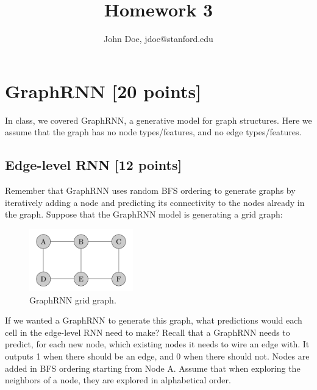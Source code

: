 \documentclass{article}
\title{Homework 3}
\author{John Doe, jdoe@stanford.edu}
\begin{document}
\maketitle

\section{GraphRNN [20 points]}

In class, we covered GraphRNN, a generative model for graph structures. Here we assume that the graph has no node types/features, and no edge types/features.

\subsection{Edge-level RNN [12 points]}
Remember that GraphRNN uses random BFS ordering to generate graphs by
iteratively adding a node and predicting its connectivity to the nodes already in the graph. Suppose that the GraphRNN model is generating a grid graph:
\begin{figure}[H]
    \centering
    \includegraphics[width=0.4\textwidth]{hw3-q1.jpg}
    \caption{GraphRNN grid graph.}
\end{figure}
If we wanted a GraphRNN to generate this graph, what predictions would each cell in the edge-level RNN need to make? Recall that a GraphRNN needs to predict, for each new node, which existing nodes it needs to wire an edge with. It outputs 1 when there should be an edge, and 0 when there should not. Nodes are added in BFS ordering starting from Node A. Assume that when exploring the neighbors of a node, they are explored in alphabetical order.\\
\end{document}
